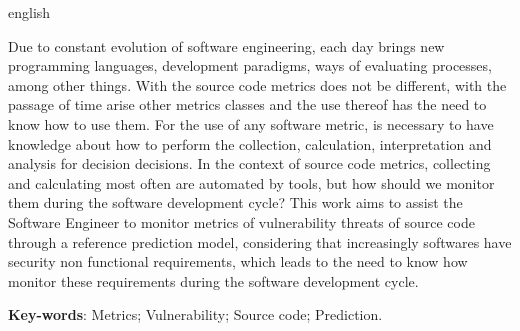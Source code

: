 \begin{resumo}[Abstract]
 \begin{otherlanguage*}{english}

Due to constant evolution of software engineering, each day brings new
programming languages, development paradigms, ways of evaluating processes,
among other things. With the source code metrics does not be different, with
the passage of time arise other metrics classes and the use thereof has the
need to know how to use them. For the use of any software metric, is necessary
to have knowledge about how to perform the collection, calculation,
interpretation and analysis for decision decisions. In the context of source
code metrics, collecting and calculating most often are automated by tools, but
how should we monitor them during the software development cycle? This work
aims to assist the Software Engineer to monitor metrics of vulnerability
threats of source code through a reference prediction model, considering that
increasingly softwares have security non functional requirements, which leads
to the need to know how monitor these requirements during the software
development cycle.

   \vspace{\onelineskip}
 
   \noindent 
   \textbf{Key-words}: Metrics; Vulnerability; Source code; Prediction.
 \end{otherlanguage*}
\end{resumo}
